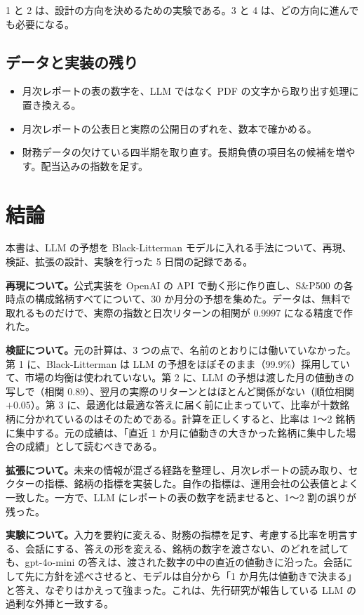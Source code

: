 \documentclass[xelatex,ja=standard,jafont=hiragino-pron,a4paper,10pt]{bxjsreport}
\newcommand{\SP}{S\&P500}
\begin{document}
1 と 2 は、設計の方向を決めるための実験である。3 と 4 は、どの方向に進んでも必要になる。

\section{データと実装の残り}

\begin{itemize}
\item 月次レポートの表の数字を、LLM ではなく PDF の文字から取り出す処理に置き換える。
\item 月次レポートの公表日と実際の公開日のずれを、数本で確かめる。
\item 財務データの欠けている四半期を取り直す。長期負債の項目名の候補を増やす。配当込みの指数を足す。
\end{itemize}

\chapter{結論}\label{ch:conclusion}

本書は、LLM の予想を Black-Litterman モデルに入れる手法について、再現、検証、拡張の設計、実験を行った 5 日間の記録である。

\textbf{再現について。}公式実装を OpenAI の API で動く形に作り直し、\SP{} の各時点の構成銘柄すべてについて、30 か月分の予想を集めた。データは、無料で取れるものだけで、実際の指数と日次リターンの相関が 0.9997 になる精度で作れた。

\textbf{検証について。}元の計算は、3 つの点で、名前のとおりには働いていなかった。第 1 に、Black-Litterman は LLM の予想をほぼそのまま（99.9\%）採用していて、市場の均衡は使われていない。第 2 に、LLM の予想は渡した月の値動きの写しで（相関 0.89）、翌月の実際のリターンとはほとんど関係がない（順位相関 $+0.05$）。第 3 に、最適化は最適な答えに届く前に止まっていて、比率が十数銘柄に分かれているのはそのためである。計算を正しくすると、比率は 1〜2 銘柄に集中する。元の成績は、「直近 1 か月に値動きの大きかった銘柄に集中した場合の成績」として読むべきである。

\textbf{拡張について。}未来の情報が混ざる経路を整理し、月次レポートの読み取り、セクターの指標、銘柄の指標を実装した。自作の指標は、運用会社の公表値とよく一致した。一方で、LLM にレポートの表の数字を読ませると、1〜2 割の誤りが残った。

\textbf{実験について。}入力を要約に変える、財務の指標を足す、考慮する比率を明言する、会話にする、答えの形を変える、銘柄の数字を渡さない、のどれを試しても、gpt-4o-mini の答えは、渡された数字の中の直近の値動きに沿った。会話にして先に方針を述べさせると、モデルは自分から「1 か月先は値動きで決まる」と答え、なぞりはかえって強まった。これは、先行研究が報告している LLM の過剰な外挿と一致する。
\end{document}
